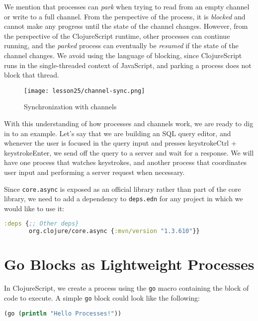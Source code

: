 \documentclass[10pt,twoside,openright]{memoir}
\begin{document}
\begin{notice}[title={Parking or Blocking?}]
We mention that processes can \emph{park} when trying to read from an
empty channel or write to a full channel. From the perspective of the
process, it is \emph{blocked} and cannot make any progress until the
state of the channel changes. However, from the perspective of the
ClojureScript runtime, other processes can continue running, and the
\emph{parked} process can eventually be \emph{resumed} if the state of
the channel changes. We avoid using the language of blocking, since
ClojureScript runs in the single-threaded context of JavaScript, and
parking a process does not block that thread.
\end{notice}

\begin{figure}[H]
\caption{Synchronization with channels}
\centering
\texttt{[image: lesson25/channel-sync.png]}
\end{figure}

With this understanding of how processes and channels work, we are ready
to dig in to an example. Let's say that we are building an SQL query
editor, and whenever the user is focused in the query input and presses
keystroke{Ctrl} + keystroke{Enter}, we send off the query to a server and wait for a response.
We will have one process that watches keystrokes, and another process
that coordinates user input and performing a server request when
necessary.

Since \texttt{core.async} is exposed as an official library rather than
part of the core library, we need to add a dependency to
\texttt{deps.edn} for any project in which we would like to use it:

\begin{lstlisting}[language=Clojure, caption={deps.edn}]
:deps {;; Other deps}
       org.clojure/core.async {:mvn/version "1.3.610"}}
\end{lstlisting}


\section{Go Blocks as Lightweight Processes}

In ClojureScript, we create a process using the \texttt{go} macro
containing the block of code to execute. A simple \texttt{go} block
could look like the following:

\begin{lstlisting}[language=Clojure]
(go (println "Hello Processes!"))
\end{lstlisting}
\end{document}
